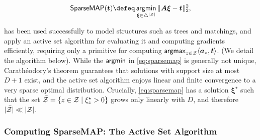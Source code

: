 \begin{equation}\label{eq:sparsemap}
    \smapop(\bm{t}) \defeq \argmin_{\pv \in \simplex^{|\ZZ|}}
    \|\bm{A}\pv - \bm{t}\|_2^2,
\end{equation}

\smap has been used successfully to model structures such as trees
and matchings, and \citet{niculae2018sparsemap} apply an active set
algorithm for evaluating it and computing gradients efficiently,
requiring only a primitive for computing $\operatorname*{\mathsf{argmax}}_{z \in \mathcal{Z}} \langle
    \bm{a}_z, \bm{t}\rangle$. (We detail the algorithm below). While the
$\operatorname*{\mathsf{argmin}}$ in \eqref{eq:sparsemap} is generally not unique,
Carath\'eodory's theorem guarantees that solutions with support size
at most $D+1$ exist, and the active set algorithm enjoys linear and
finite convergence to a very sparse optimal distribution. Crucially,
\eqref{eq:sparsemap} has a solution $\bm{\xi}^\star$ such that the
set $\bar{\mathcal{Z}} = \left\{z \in \mathcal{Z} \mid \xi^\star_z > 0\right\}$ grows
only linearly with $D$, and therefore $|\bar{\mathcal{Z}}| \ll |\mathcal{Z}|$.

\subsubsection{Computing SparseMAP: The Active Set Algorithm}\label{sec:smap_as_bg}

